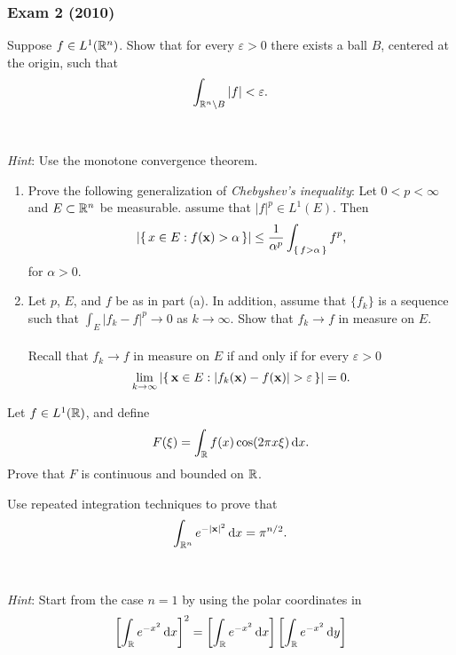 \subsubsection{Exam 2 (2010)}
\setcounter{exercise}{0}
\setcounter{equation}{0}

\begin{problem}
Suppose $f\in L^1(\mathbb{R}^n)$. Show that for every $\varepsilon>0$ there
exists a ball $B$, centered at the origin, such that
\[
\int_{\mathbb{R}^n\setminus B}|f|<\varepsilon.
\]
\\\\
\emph{Hint}: Use the monotone convergence theorem.
\end{problem}
\begin{solution}
\end{solution}
\begin{problem}
\begin{enumerate}[label=(\alph*),noitemsep]
\item Prove the following generalization of \emph{Chebyshev's inequality}:
  Let $0<p<\infty$ and $E\subset\mathbb{R}^n$ be measurable. assume that
  $|f|^p\in L^1(E)$. Then
\[
\left|\left\{\,x\in E:f(\mathbf{x})>\alpha\,\right\}\right|
\leq\frac{1}{\alpha^p}\int_{\left\{\,f>\alpha\,\right\}}f^p,
\]
for $\alpha>0$.
\item Let $p$, $E$, and $f$ be as in part (a). In addition, assume that
  $\{f_k\}$ is a sequence such that $\int_E|f_k-f|^p\to 0$ as
  $k\to\infty$. Show that $f_k\to f$ in measure on $E$.
\\\\
Recall that $f_k\to f$ in measure on $E$ if and only if for every
$\varepsilon>0$
\[
\lim_{k\to\infty}\left|\left\{\,\bfx\in
    E:|f_k(\bfx)-f(\bfx)|>\varepsilon\,\right\}\right|=0.
\]
\end{enumerate}
\end{problem}
\begin{solution}
\end{solution}

\begin{problem}
Let $f\in L^1(\mathbb{R})$, and define
\[
F(\xi)=\int_{\mathbb{R}} f(x)\cos(2\pi x\xi)\mathop{}\!\mathrm{d} x.
\]
Prove that $F$ is continuous and bounded on $\mathbb{R}$.
\end{problem}
\begin{solution}
\end{solution}

\begin{problem}
Use repeated integration techniques to prove that
\[
\int_{\mathbb{R}^n} e^{-|\mathbf{x}|^2}\mathop{}\!\mathrm{d} x=\pi^{n/2}.
\]
\\\\
\emph{Hint}: Start from the case $n=1$ by using the polar coordinates in
\[
  \left[\int_\bbR e^{-x^2}\diff x\right]^2=%
  \left[\int_\bbR e^{-x^2}\diff x\right]%
  \left[\int_\bbR e^{-x^2}\diff y\right]%
\]
\end{problem}
\begin{solution}
\end{solution}

\begin{problem}
\end{problem}
\begin{solution}
\end{solution}

